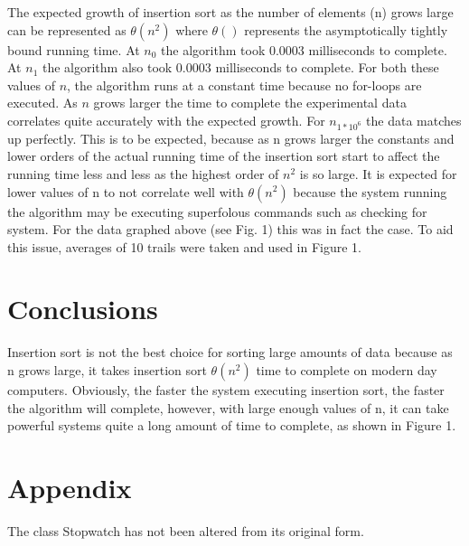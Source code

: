 \documentclass[onecolumn, 12pt, article]{IEEEtran}
\numberwithin{case}{problem}
\numberwithin{condition}{problem}
\numberwithin{condition}{subsection}
\numberwithin{definition}{section}
\theoremstyle{remark}
\numberwithin{question}{problem}
\theoremstyle{plain}
\numberwithin{answer}{problem}
\numberwithin{solution}{section}
\numberwithin{equation}{section}%
\begin{document}
The expected growth of insertion sort as the number of elements (n) grows large can be represented as $ \theta(n^2) $ where $ \theta() $ represents the asymptotically tightly bound running time. At $n_0$ the algorithm took 0.0003 milliseconds to complete. At $n_1$ the algorithm also took 0.0003 milliseconds to complete. For both these values of $n$, the algorithm runs at a constant time because no for-loops are executed. As $n$ grows larger the time to complete the experimental data correlates quite accurately with the expected growth. For $n_{1*10^6} $ the data matches up perfectly. This is to be expected, because as n grows larger the constants and lower orders of the actual running time of the insertion sort start to affect the running time less and less as the highest order of $n^2$ is so large. It is expected for lower values of n to not correlate well with $ \theta(n^2) $ because the system running the algorithm may be executing superfolous commands such as checking for system. For the data graphed above (see Fig. 1) this was in fact the case. To aid this issue, averages of 10 trails were taken and used in Figure 1.

\section{Conclusions}
Insertion sort is not the best choice for sorting large amounts of data because as n grows large, it takes insertion sort $ \theta(n^2) $ time to complete on modern day computers. Obviously, the faster the system executing insertion sort, the faster the algorithm will complete, however, with large enough values of n, it can take powerful systems quite a long amount of time to complete, as shown in Figure 1. 

\newpage


\nocite{*}




\newpage

\section*{Appendix}




The class Stopwatch has not been altered from its original form.
\newline



\end{document}
